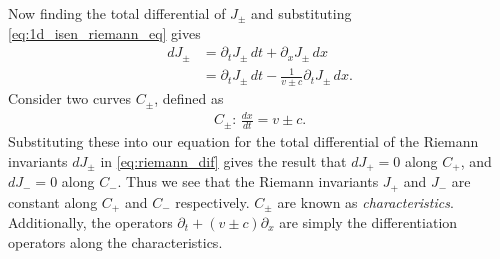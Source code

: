 Now finding the total differential of $J_\pm$ and substituting \eqref{eq:1d_isen_riemann_eq} gives
\begin{align}
    d J_\pm &= \partial_t J_\pm \, dt + \partial_x J_\pm \, dx \\
    &= \partial_t J_\pm \, dt - \frac{1}{v \pm c} \partial_t J_\pm \, dx. \label{eq:riemann_dif}
\end{align}
Consider two curves $C_\pm$, defined as 
\begin{align}
    C_\pm: \, \frac{dx}{dt} = v \pm c.
\end{align}
Substituting these into our equation for the total differential of the Riemann invariants $dJ_\pm$ in \eqref{eq:riemann_dif} gives the result that $dJ_+ = 0$ along $C_+$, and $dJ_- = 0$ along $C_-$.
Thus we see that the Riemann invariants $J_+$ and $J_-$ are constant along $C_+$ and $C_-$ respectively.
$C_\pm$ are known as \textit{characteristics}.
Additionally, the operators $\partial_t + (v \pm c)\partial_x$ are simply the differentiation operators along the characteristics.
